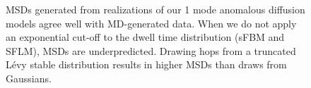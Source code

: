\documentclass{article}
\begin{document}
\begin{figure}
  \caption{MSDs generated from realizations of our 1 mode anomalous diffusion models
  agree well with MD-generated data. When we do not apply an exponential cut-off to the
  dwell time distribution (sFBM and SFLM), MSDs are underpredicted. Drawing hops from
  a truncated L\'evy stable distribution results in higher MSDs than draws from Gaussians.}\label{fig:anomalous_msds_1mode}
  \end{figure}
  
\end{document}
